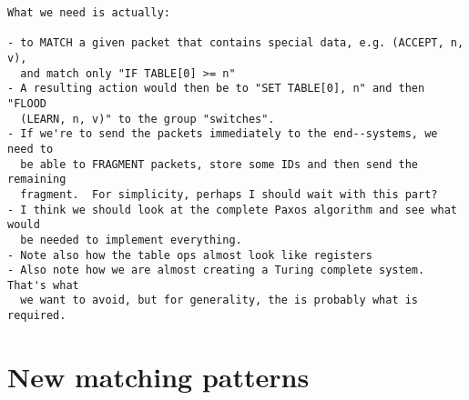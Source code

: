 \begin{verbatim}
What we need is actually:

- to MATCH a given packet that contains special data, e.g. (ACCEPT, n, v),
  and match only "IF TABLE[0] >= n"
- A resulting action would then be to "SET TABLE[0], n" and then "FLOOD
  (LEARN, n, v)" to the group "switches".
- If we're to send the packets immediately to the end--systems, we need to
  be able to FRAGMENT packets, store some IDs and then send the remaining
  fragment.  For simplicity, perhaps I should wait with this part?
- I think we should look at the complete Paxos algorithm and see what would
  be needed to implement everything.
- Note also how the table ops almost look like registers
- Also note how we are almost creating a Turing complete system. That's what
  we want to avoid, but for generality, the is probably what is required.
\end{verbatim}

\section{New matching patterns}
